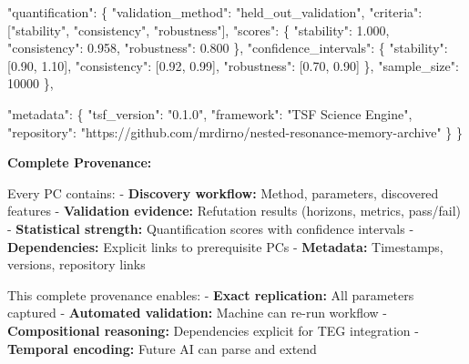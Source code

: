 \documentclass[
]{article}
\newenvironment{Shaded}{}{}
\newcommand{\DataTypeTok}[1]{\textcolor[rgb]{0.56,0.13,0.00}{#1}}
\newcommand{\DecValTok}[1]{\textcolor[rgb]{0.25,0.63,0.44}{#1}}
\newcommand{\FloatTok}[1]{\textcolor[rgb]{0.25,0.63,0.44}{#1}}
\newcommand{\FunctionTok}[1]{\textcolor[rgb]{0.02,0.16,0.49}{#1}}
\newcommand{\OtherTok}[1]{\textcolor[rgb]{0.00,0.44,0.13}{#1}}
\newcommand{\StringTok}[1]{\textcolor[rgb]{0.25,0.44,0.63}{#1}}
\begin{document}
\begin{Shaded}
\begin{Highlighting}[]
  \DataTypeTok{"quantification"}\FunctionTok{:} \FunctionTok{\{}
    \DataTypeTok{"validation\_method"}\FunctionTok{:} \StringTok{"held\_out\_validation"}\FunctionTok{,}
    \DataTypeTok{"criteria"}\FunctionTok{:} \OtherTok{[}\StringTok{"stability"}\OtherTok{,} \StringTok{"consistency"}\OtherTok{,} \StringTok{"robustness"}\OtherTok{]}\FunctionTok{,}
    \DataTypeTok{"scores"}\FunctionTok{:} \FunctionTok{\{}
      \DataTypeTok{"stability"}\FunctionTok{:} \FloatTok{1.000}\FunctionTok{,}
      \DataTypeTok{"consistency"}\FunctionTok{:} \FloatTok{0.958}\FunctionTok{,}
      \DataTypeTok{"robustness"}\FunctionTok{:} \FloatTok{0.800}
    \FunctionTok{\},}
    \DataTypeTok{"confidence\_intervals"}\FunctionTok{:} \FunctionTok{\{}
      \DataTypeTok{"stability"}\FunctionTok{:} \OtherTok{[}\FloatTok{0.90}\OtherTok{,} \FloatTok{1.10}\OtherTok{]}\FunctionTok{,}
      \DataTypeTok{"consistency"}\FunctionTok{:} \OtherTok{[}\FloatTok{0.92}\OtherTok{,} \FloatTok{0.99}\OtherTok{]}\FunctionTok{,}
      \DataTypeTok{"robustness"}\FunctionTok{:} \OtherTok{[}\FloatTok{0.70}\OtherTok{,} \FloatTok{0.90}\OtherTok{]}
    \FunctionTok{\},}
    \DataTypeTok{"sample\_size"}\FunctionTok{:} \DecValTok{10000}
  \FunctionTok{\},}

  \DataTypeTok{"metadata"}\FunctionTok{:} \FunctionTok{\{}
    \DataTypeTok{"tsf\_version"}\FunctionTok{:} \StringTok{"0.1.0"}\FunctionTok{,}
    \DataTypeTok{"framework"}\FunctionTok{:} \StringTok{"TSF Science Engine"}\FunctionTok{,}
    \DataTypeTok{"repository"}\FunctionTok{:} \StringTok{"https://github.com/mrdirno/nested{-}resonance{-}memory{-}archive"}
  \FunctionTok{\}}
\FunctionTok{\}}
\end{Highlighting}
\end{Shaded}

\textbf{Complete Provenance:}

Every PC contains: - \textbf{Discovery workflow:} Method, parameters,
discovered features - \textbf{Validation evidence:} Refutation results
(horizons, metrics, pass/fail) - \textbf{Statistical strength:}
Quantification scores with confidence intervals - \textbf{Dependencies:}
Explicit links to prerequisite PCs - \textbf{Metadata:} Timestamps,
versions, repository links

This complete provenance enables: - \textbf{Exact replication:} All
parameters captured - \textbf{Automated validation:} Machine can re-run
workflow - \textbf{Compositional reasoning:} Dependencies explicit for
TEG integration - \textbf{Temporal encoding:} Future AI can parse and
extend
\end{document}
